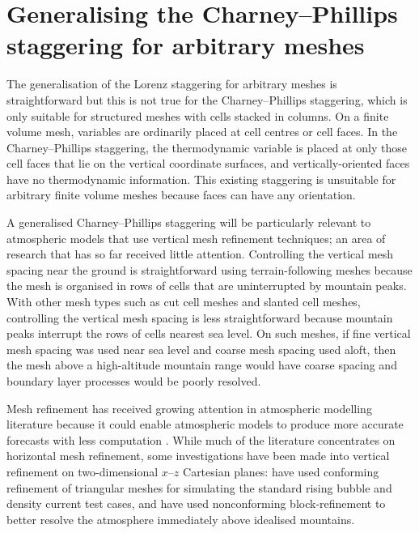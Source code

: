 \section{Generalising the Charney–Phillips staggering for arbitrary meshes}
\label{sec:cp:method}


The generalisation of the Lorenz staggering for arbitrary meshes is straightforward \citep{weller-shahrokhi2014} but this is not true for the Charney--Phillips staggering, which is only suitable for structured meshes with cells stacked in columns.
On a finite volume mesh, variables are ordinarily placed at cell centres or cell faces.
In the Charney--Phillips staggering, the thermodynamic variable is placed at only those cell faces that lie on the vertical coordinate surfaces, and vertically-oriented faces have no thermodynamic information.
This existing staggering is unsuitable for arbitrary finite volume meshes because faces can have any orientation.

A generalised Charney--Phillips staggering will be particularly relevant to atmospheric models that use vertical mesh refinement techniques; an area of research that has so far received little attention.
Controlling the vertical mesh spacing near the ground is straightforward using terrain-following meshes because the mesh is organised in rows of cells that are uninterrupted by mountain peaks.
With other mesh types such as cut cell meshes and slanted cell meshes, controlling the vertical mesh spacing is less straightforward because mountain peaks interrupt the rows of cells nearest sea level.
On such meshes, if fine vertical mesh spacing was used near sea level and coarse mesh spacing used aloft, then the mesh above a high-altitude mountain range would have coarse spacing and boundary layer processes would be poorly resolved.

Mesh refinement has received growing attention in atmospheric modelling literature because it could enable atmospheric models to produce more accurate forecasts with less computation \citep{behrens2006,jablonowski2009}.
While much of the literature concentrates on horizontal mesh refinement, some investigations have been made into vertical refinement on two-dimensional $x$--$z$ Cartesian planes:
\citet{mueller2013} have used conforming refinement of triangular meshes for simulating the standard rising bubble and density current test cases, and \citet{yamazaki-satomura2012} have used nonconforming block-refinement to better resolve the atmosphere immediately above idealised mountains.

